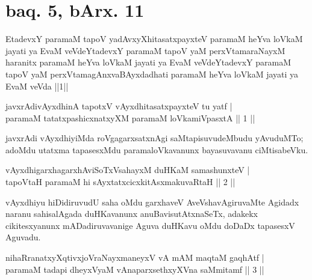 \centerline{}

\section*{baq. 5, bArx. 11}

\begin{shl}
EtadevxY paramaM tapoV yadAvxyXhitasatxpayxteV paramaM heYva loVkaM jayati ya EvaM veVdeYtadevxY paramaM tapoV yaM perxVtamaraNayxM haranitx paramaM heYva loVkaM jayati ya EvaM veVdeYtadevxY paramaM tapoV yaM perxVtamagAnxvaBAyxdadhati paramaM heYva loVkaM jayati ya EvaM veVda ||1||
\end{shl}



\begin{shl}
javxrAdivAyxdhinA tapotxV vAyxdhitasatxpayxteV tu yatf | \\
paramaM tatatxpashicxnatxyXM paramaM loVkamiVpasxtA \hfill ||  1 ||
\end{shl}

\begin{artha}
javxrAdi vAyxdhiyiMda roVgagarxsatxnAgi saMtapisuvudeMbudu yAvuduMTo; adoMdu utatxma tapasesxMdu paramaloVkavanunx bayasuvavanu ciMtisabeVku.
\end{artha}


\begin{shl}
vAyxdhigarxhagarxhAviSoTxV\s sahayxM duHKaM samashunxteV | \\
tapoV\s taH paramaM hi sAyxtatxcicxkitAsxmakuvaRtaH \hfill ||  2 || 
\end{shl}

\begin{artha}
vAyxdhiyu hiDidiruvudU saha oMdu garxhaveV AveVshavAgiruvaMte Agidadx naranu sahisalAgada duHKavanunx anuBavisutAtxnaSeTx, adakekx cikitesxyanunx mADadiruvavanige Aguva duHKavu oMdu doDaDx tapasesxV Aguvadu.
\end{artha}


\begin{shl}
nihaRranatxyXqtivxjoV\s raNayxmaneyxV vA mAM maqtaM gaqhAtf | \\
paramaM tadapi dheyxVyaM vAnaparxsethxyXVna saMmitamf \hfill ||  3 || 
\end{shl}


